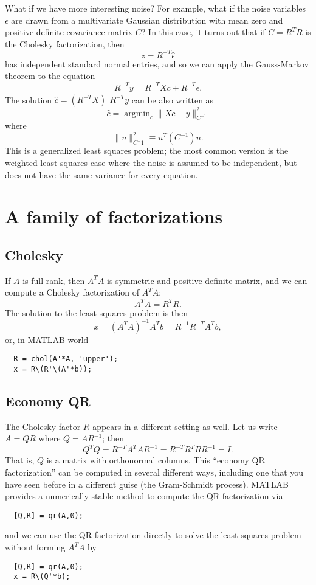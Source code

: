 \documentclass[12pt, leqno]{article} %
\begin{document}
What if we have more interesting noise?  For example, what if the
noise variables $\epsilon$ are drawn from a multivariate Gaussian
distribution with mean zero and positive definite covariance matrix $C$?
In this case, it turns out that if $C = R^T R$ is the
Cholesky factorization, then
\[
  z = R^{-T} \hat{\epsilon}
\]
has independent standard normal entries, and so we can apply
the Gauss-Markov theorem to the equation
\[
  R^{-T} y = R^{-T} X c + R^{-T} \epsilon.
\]
The solution $\hat{c} = (R^{-T} X)^{\dagger} R^{-T} y$ can be also
written as
\[
  \hat{c} = \operatorname{argmin}_c \|Xc-y\|^2_{C^{-1}}
\]
where
\[
  \|u\|_{C^-1}^2 \equiv u^T (C^{-1}) u.
\]
This is a generalized least squares problem; the most common version
is the weighted least squares case where the noise is assumed to
be independent, but does not have the same variance for every equation.

\section{A family of factorizations}

\subsection{Cholesky}

If $A$ is full rank, then $A^T A$ is symmetric and positive definite
matrix, and we can compute a Cholesky factorization of $A^T A$:
\[
  A^T A = R^T R.
\]
The solution to the least squares problem is then
\[
  x = (A^T A)^{-1} A^T b = R^{-1} R^{-T} A^T b,
\]
or, in MATLAB world
\begin{lstlisting}
  R = chol(A'*A, 'upper');
  x = R\(R'\(A'*b));
\end{lstlisting}

\subsection{Economy QR}

The Cholesky factor $R$ appears in a different setting as well.
Let us write $A = QR$ where $Q = AR^{-1}$; then
\[
  Q^T Q = R^{-T} A^T A R^{-1} = R^{-T} R^T R R^{-1} = I.
\]
That is, $Q$ is a matrix with orthonormal columns.  This
``economy QR factorization'' can be computed in several different
ways, including one that you have seen before in a different guise
(the Gram-Schmidt process).  MATLAB provides a numerically stable
method to compute the QR factorization via
\begin{lstlisting}
  [Q,R] = qr(A,0);
\end{lstlisting}
and we can use the QR factorization directly to solve the least
squares problem without forming $A^T A$ by
\begin{lstlisting}
  [Q,R] = qr(A,0);
  x = R\(Q'*b);
\end{lstlisting}
\end{document}
